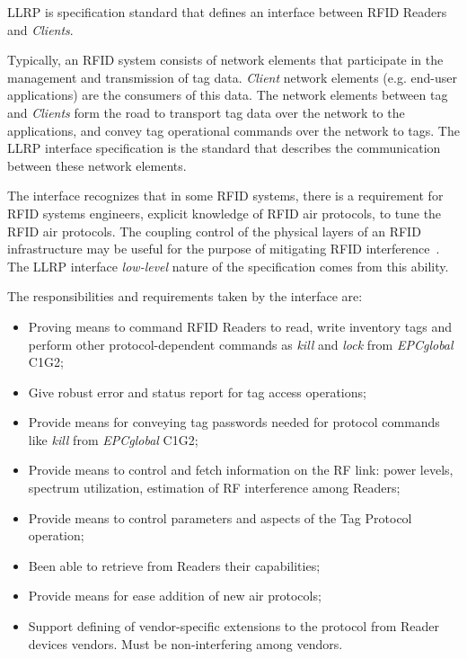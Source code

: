 \gls{LLRP} is specification standard that defines an interface between \gls{RFID} Readers and \emph{Clients}.

Typically, an RFID system consists of network elements that participate in the management and transmission of tag data.
\emph{Client} network elements (e.g. end-user applications) are the consumers of this data.
The network elements between tag and \emph{Clients} form the road to transport tag data over the network to the applications, and convey tag operational commands over the network to tags.
The \gls{LLRP} interface specification is the standard that describes the communication between these network elements.


The interface recognizes that in some RFID systems, there is a requirement for RFID systems engineers, explicit knowledge of RFID air protocols, to tune the RFID air protocols. 
The coupling control of the physical layers of an RFID infrastructure may be useful for the purpose of mitigating RFID interference~\cite{Llrp1standard20101013Pdf}.
The \gls{LLRP} interface \emph{low-level} nature of the specification comes from this ability.

The responsibilities and requirements taken by the interface are:

\begin{itemize}
    \setlength{\parskip}{0pt}
    \setlength{\itemsep}{0pt}
    \item Proving means to command \gls{RFID} Readers to read, write inventory tags and perform other protocol-dependent commands as \emph{kill} and \emph{lock} from \emph{EPCglobal} \gls{C1G2};
    \item Give robust error and status report for tag access operations;
    \item Provide means for conveying tag passwords needed for protocol commands like \emph{kill} from \emph{EPCglobal} \gls{C1G2};
    \item Provide means to control and fetch information on the \gls{RF} link: power levels, spectrum utilization, estimation of \gls{RF} interference among Readers;
    \item Provide means to control parameters and aspects of the Tag Protocol operation;
    \item Been able to retrieve from Readers their capabilities;
    \item Provide means for ease addition of new air protocols;
    \item Support defining of vendor-specific extensions to the protocol from Reader devices vendors. Must be non-interfering  among vendors.
\end{itemize}

